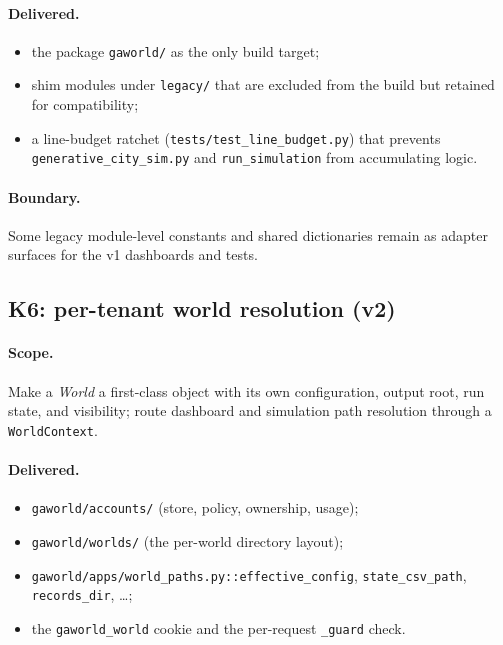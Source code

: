 \paragraph{Delivered.}
\begin{itemize}[leftmargin=*]
  \item the package \texttt{gaworld/} as the only build target;
  \item shim modules under \texttt{legacy/} that are excluded from the
  build but retained for compatibility;
  \item a line-budget ratchet (\texttt{tests/test\_line\_budget.py}) that
  prevents \texttt{generative\_city\_sim.py} and \texttt{run\_simulation}
  from accumulating logic.
\end{itemize}

\paragraph{Boundary.}
Some legacy module-level constants and shared dictionaries remain as
adapter surfaces for the v1 dashboards and tests.

\subsection{K6: per-tenant world resolution (v2)}

\paragraph{Scope.}  Make a \emph{World} a first-class object with its own
configuration, output root, run state, and visibility; route dashboard
and simulation path resolution through a \texttt{WorldContext}.

\paragraph{Delivered.}
\begin{itemize}[leftmargin=*]
  \item \texttt{gaworld/accounts/} (store, policy, ownership, usage);
  \item \texttt{gaworld/worlds/} (the per-world directory layout);
  \item \texttt{gaworld/apps/world\_paths.py::effective\_config},
  \texttt{state\_csv\_path}, \texttt{records\_dir}, \ldots;
  \item the \texttt{gaworld\_world} cookie and the per-request
  \texttt{\_guard} check.
\end{itemize}

